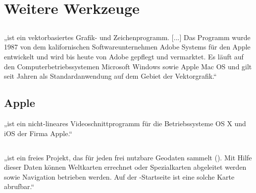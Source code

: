 \section{Weitere Werkzeuge}
	
	\subsection{\Illustrator}
	
	„\Illustrator [...] ist ein vektorbasiertes Grafik- und Zeichenprogramm. [...] Das Programm wurde 1987 von dem kalifornischen Softwareunternehmen Adobe Systems für den Apple  entwickelt und wird bis heute von Adobe gepflegt und vermarktet. Es läuft auf den Computerbetriebssystemen Microsoft Windows sowie Apple Mac OS und gilt seit Jahren als Standardanwendung auf dem Gebiet der Vektorgrafik.“ \cite{Wiki-Illustrator}
	
	\subsection{Apple \iMovie}
	
	„\iMovie ist ein nicht-lineares Videoschnittprogramm für die Betriebssysteme OS X und iOS der Firma Apple.“ \cite{Wiki-iMovie}
	
	\subsection{\OSM}
	
	„\OSM ist ein freies Projekt, das für jeden frei nutzbare Geodaten sammelt (). Mit Hilfe dieser Daten können Weltkarten errechnet oder Spezialkarten abgeleitet werden sowie Navigation betrieben werden. Auf der \OSM-Startseite ist eine solche Karte abrufbar.“ \cite{Wiki-OSM}